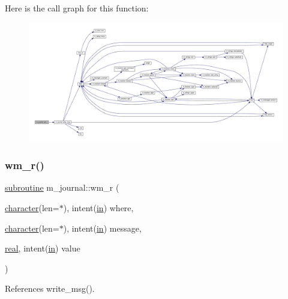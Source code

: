 Here is the call graph for this function\+:
\nopagebreak
\begin{figure}[H]
\begin{center}
\leavevmode
\includegraphics[width=350pt]{namespacem__journal_a3229165c77bc7f39fbf88fbcfbdb401e_cgraph}
\end{center}
\end{figure}
\mbox{\label{namespacem__journal_ad22893c3621042df7d66b9f3864aa457}} 
\subsubsection{\texorpdfstring{wm\+\_\+r()}{wm\_r()}}
{\footnotesize\ttfamily \hyperlink{M__stopwatch_83_8txt_acfbcff50169d691ff02d4a123ed70482}{subroutine} m\+\_\+journal\+::wm\+\_\+r (\begin{DoxyParamCaption}\item[{\hyperlink{option__stopwatch_83_8txt_abd4b21fbbd175834027b5224bfe97e66}{character}(len=$\ast$), intent(\hyperlink{M__journal_83_8txt_afce72651d1eed785a2132bee863b2f38}{in})}]{where,  }\item[{\hyperlink{option__stopwatch_83_8txt_abd4b21fbbd175834027b5224bfe97e66}{character}(len=$\ast$), intent(\hyperlink{M__journal_83_8txt_afce72651d1eed785a2132bee863b2f38}{in})}]{message,  }\item[{\hyperlink{read__watch_83_8txt_abdb62bde002f38ef75f810d3a905a823}{real}, intent(\hyperlink{M__journal_83_8txt_afce72651d1eed785a2132bee863b2f38}{in})}]{value }\end{DoxyParamCaption})\hspace{0.3cm}{\ttfamily [private]}}



References write\+\_\+msg().

